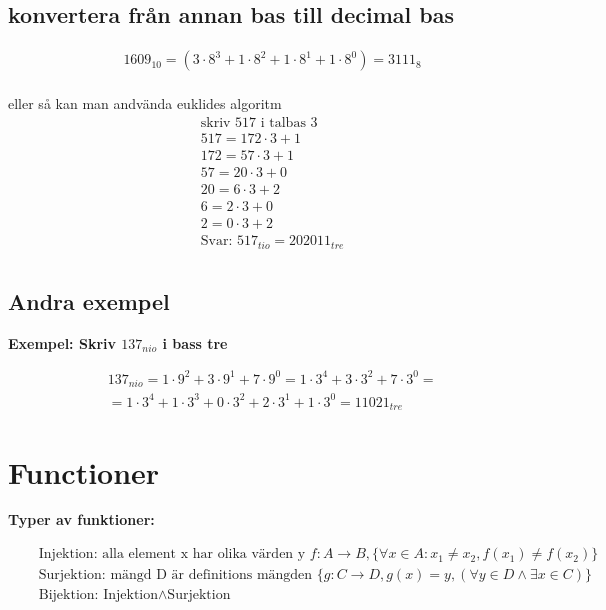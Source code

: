 \documentclass{article}
\begin{document}
\subsection{konvertera från annan bas till decimal bas}
\begin{align*}
  &\quad  1609_{10} = (3 \cdot 8^3 + 1 \cdot 8^2 + 1 \cdot 8^1 + 1 \cdot 8^0) = 3111_8 \\
\end{align*}

eller så kan man andvända euklides algoritm 
\begin{align*}
  &\quad  \text{skriv 517 i talbas 3} \\
  &\quad  517 = 172 \cdot 3 + 1 \\
  &\quad  172 =  57 \cdot 3 + 1 \\
  &\quad   57 =  20 \cdot 3 + 0 \\
  &\quad   20 =   6 \cdot 3 + 2 \\
  &\quad    6 =   2 \cdot 3 + 0 \\
  &\quad    2 =   0 \cdot 3 + 2 \\
  &\quad  \text{Svar: } 517_{tio} = 202011_{tre} \\
\end{align*}

\subsection{Andra exempel}
\textbf{Exempel: Skriv $137_{nio}$  i bass tre}\par
\begin{align*}
  &\quad  137_{nio} = 1 \cdot 9^2 + 3 \cdot 9^1 + 7 \cdot 9^0 = 1 \cdot 3^4 + 3 \cdot 3^2 + 7 \cdot 3^0 =  \\
  &\quad  = 1 \cdot 3^4 + 1 \cdot 3^3 + 0 \cdot 3^2 + 2 \cdot 3^1 + 1 \cdot 3^0 = 11021_{tre}
\end{align*}


\newpage

\section{Functioner}
\textbf{Typer av funktioner:}\par 
\begin{align*}
  &\quad  \text{Injektion: alla element x har olika värden y } f: A \to B, \{{\forall x \in A: x_1 \neq x_2, f(x_1) \neq f(x_2)}\} \\
  &\quad  \text{Surjektion: mängd D är definitions mängden } \{g: C \to D, g(x)=y, (\forall y \in D \land \exists x \in C)\} \\
  &\quad  \text{Bijektion: } \text{Injektion} \land \text{Surjektion}  \\
\end{align*}
 
\end{document}

